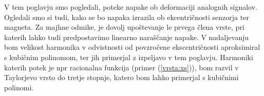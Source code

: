 V tem poglavju smo pogledali, poteke napake ob deformaciji analognih signalov. Ogledali smo si tudi, kako se bo napaka izrazila ob ekcentričnosti senzorja ter magneta. Za majhne odmike, je dovolj upoštevanje le prvega člena vrste, pri katerih lahko tudi predpostavimo linearno naraščanje napake. V nadaljevanju bom velikost harmonika v odvistnosti od povzročene ekscentričnosti aproksimiral s kubičnim polinomom, ter jih primerjal z izpeljavo v tem poglavju. Harmoniki katerih potek je npr racionalna funkcija (primer (\ref{vrsta:xs})), bom razvil v Taylorjevo vrsto do tretje stopnje, katero bom lahko primerjal s kubičnimi polinomi.
 









%
%
%
%
%
%
%
%
